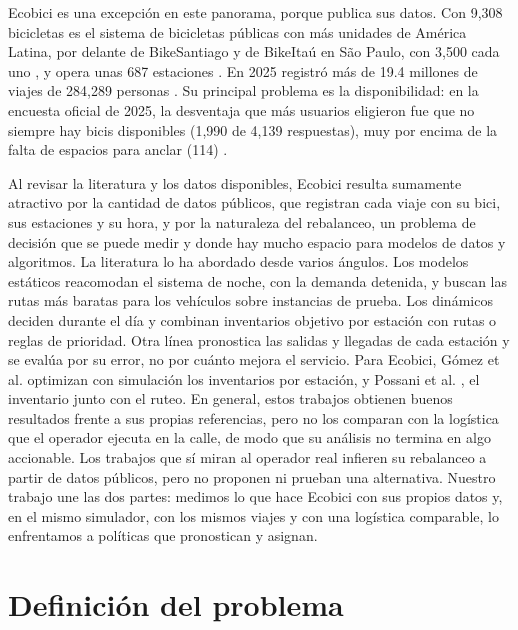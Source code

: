 \documentclass[conference,letterpaper,10pt]{IEEEtran}
\begin{document}
Ecobici es una excepción en este panorama, porque publica sus datos. Con 9,308 bicicletas es el sistema de bicicletas públicas con más unidades de América Latina, por delante de BikeSantiago y de BikeItaú en São Paulo, con 3,500 cada uno \cite{eluniversal2025semovi}, y opera unas 687 estaciones \cite{expansion2026}. En 2025 registró más de 19.4 millones de viajes de 284,289 personas \cite{ecobici2025balance}. Su principal problema es la disponibilidad: en la encuesta oficial de 2025, la desventaja que más usuarios eligieron fue que no siempre hay bicis disponibles (1,990 de 4,139 respuestas), muy por encima de la falta de espacios para anclar (114) \cite{encuesta2025}.

Al revisar la literatura y los datos disponibles, Ecobici resulta sumamente atractivo por la cantidad de datos públicos, que registran cada viaje con su bici, sus estaciones y su hora, y por la naturaleza del rebalanceo, un problema de decisión que se puede medir y donde hay mucho espacio para modelos de datos y algoritmos. La literatura lo ha abordado desde varios ángulos. Los modelos estáticos \cite{raviv2013static,dellamico2014} reacomodan el sistema de noche, con la demanda detenida, y buscan las rutas más baratas para los vehículos sobre instancias de prueba. Los dinámicos \cite{schuijbroek2017,legros2019} deciden durante el día y combinan inventarios objetivo por estación con rutas o reglas de prioridad. Otra línea pronostica las salidas y llegadas de cada estación \cite{li2015traffic} y se evalúa por su error, no por cuánto mejora el servicio. Para Ecobici, Gómez et al. \cite{gomez2021} optimizan con simulación los inventarios por estación, y Possani et al. \cite{possani2021}, el inventario junto con el ruteo. En general, estos trabajos obtienen buenos resultados frente a sus propias referencias, pero no los comparan con la logística que el operador ejecuta en la calle, de modo que su análisis no termina en algo accionable. Los trabajos que sí miran al operador real \cite{medard2016,luo2026} infieren su rebalanceo a partir de datos públicos, pero no proponen ni prueban una alternativa. Nuestro trabajo une las dos partes: medimos lo que hace Ecobici con sus propios datos y, en el mismo simulador, con los mismos viajes y con una logística comparable, lo enfrentamos a políticas que pronostican y asignan.

\section{Definición del problema}
\end{document}
